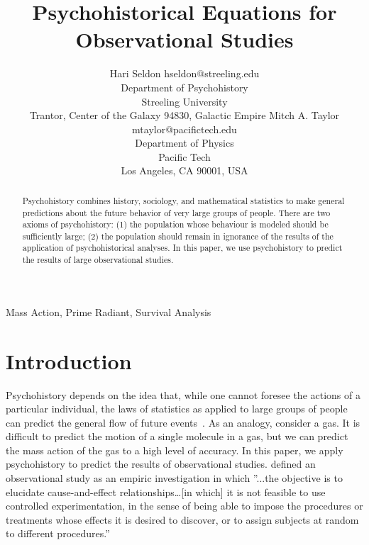 \documentclass[twoside,11pt]{article}
\begin{document}
\title{Psychohistorical Equations for Observational Studies}

\author{\name Hari Seldon \email hseldon@streeling.edu \\
       \addr Department of Psychohistory\\
       Streeling University\\
       Trantor, Center of the Galaxy 94830, Galactic Empire 
       \AND
       \name Mitch A. Taylor \email mtaylor@pacifictech.edu \\
       \addr Department of Physics\\
       Pacific Tech \\
       Los Angeles, CA 90001, USA}

\maketitle

\begin{abstract}%
Psychohistory combines history, sociology, and mathematical statistics to make general predictions about the future behavior of very large groups of people. There are two axioms of psychohistory: (1) the population whose behaviour is modeled should be sufficiently large; (2) the population should remain in ignorance of the results of the application of psychohistorical analyses.  In this paper, we use psychohistory to predict the results of large observational studies.
\end{abstract}

\begin{keywords}
  Mass Action, Prime Radiant, Survival Analysis 
\end{keywords}

\section{Introduction}

Psychohistory depends on the idea that, while one cannot foresee the actions of a particular individual, the laws of statistics as applied to large groups of people can predict the general flow of future events~\citep{hernan2010causal}.  As an analogy, consider a gas.  It is difficult to predict the motion of a single molecule in a gas, but we can predict the mass action of the gas to a high level of accuracy.  In this paper, we apply psychohistory to predict the results of observational studies.  \citet{naimi2023defining} defined an observational study as an empiric investigation in which ''...the objective is to elucidate cause-and-effect relationships…[in which] it is not feasible to use controlled experimentation, in the sense of being able to impose the procedures or treatments whose effects it is desired to discover, or to assign subjects at random to different procedures.''
\end{document}
